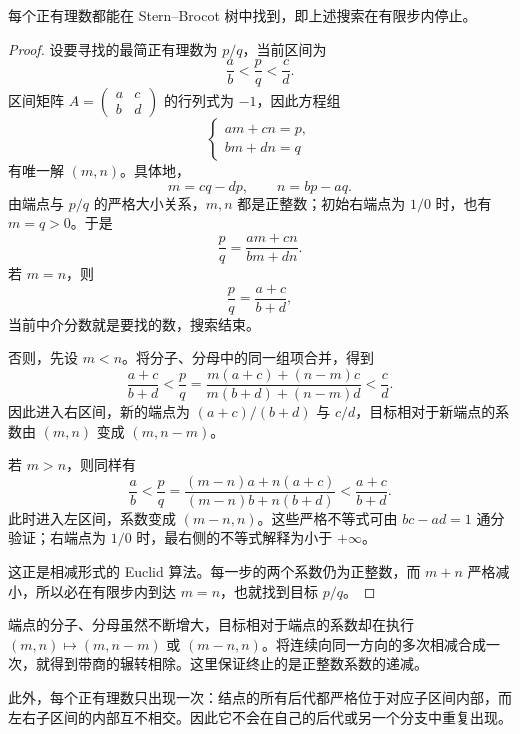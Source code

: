 \documentclass[lang=cn,a4paper,fontset=none,zihao=false,10pt,openany,twoside]{beautybook}
\numberwithin{algorithm}{chapter}
\begin{document}
\begin{theorem}
每个正有理数都能在 Stern--Brocot 树中找到，即上述搜索在有限步内停止。
\end{theorem}
\begin{proof}
设要寻找的最简正有理数为 $p/q$，当前区间为
\[
 \frac ab<\frac pq<\frac cd.
\]
区间矩阵 $A=\begin{pmatrix}a&c\\b&d\end{pmatrix}$ 的行列式为 $-1$，因此方程组
\[
 \begin{cases}
 am+cn=p,\\
 bm+dn=q
 \end{cases}
\]
有唯一解 $(m,n)$。具体地，
\[
 m=cq-dp,\qquad n=bp-aq.
\]
由端点与 $p/q$ 的严格大小关系，$m,n$ 都是正整数；初始右端点为 $1/0$ 时，也有 $m=q>0$。于是
\[
 \frac pq=\frac{am+cn}{bm+dn}.
\]
若 $m=n$，则
\[
 \frac pq=\frac{a+c}{b+d},
\]
当前中介分数就是要找的数，搜索结束。

否则，先设 $m<n$。将分子、分母中的同一组项合并，得到
\[
 \frac{a+c}{b+d}
 <\frac pq
 =\frac{m(a+c)+(n-m)c}{m(b+d)+(n-m)d}
 <\frac cd.
\]
因此进入右区间，新的端点为 $(a+c)/(b+d)$ 与 $c/d$，目标相对于新端点的系数由 $(m,n)$ 变成 $(m,n-m)$。

若 $m>n$，则同样有
\[
 \frac ab
 <\frac pq
 =\frac{(m-n)a+n(a+c)}{(m-n)b+n(b+d)}
 <\frac{a+c}{b+d}.
\]
此时进入左区间，系数变成 $(m-n,n)$。这些严格不等式可由 $bc-ad=1$ 通分验证；右端点为 $1/0$ 时，最右侧的不等式解释为小于 $+\infty$。

这正是相减形式的 Euclid 算法。每一步的两个系数仍为正整数，而 $m+n$ 严格减小，所以必在有限步内到达 $m=n$，也就找到目标 $p/q$。
\end{proof}
\begin{remark}[搜索与辗转相除]
端点的分子、分母虽然不断增大，目标相对于端点的系数却在执行
$(m,n)\mapsto(m,n-m)$ 或 $(m-n,n)$。将连续向同一方向的多次相减合成一次，就得到带商的辗转相除。这里保证终止的是正整数系数的递减。

此外，每个正有理数只出现一次：结点的所有后代都严格位于对应子区间内部，而左右子区间的内部互不相交。因此它不会在自己的后代或另一个分支中重复出现。
\end{remark}
\end{document}
